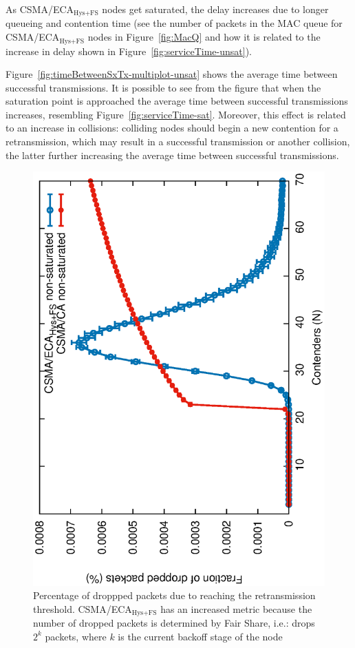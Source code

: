 	As CSMA/ECA$_{\text{Hys+FS}}$ nodes get saturated, the delay increases due to longer queueing and contention time (see the number of packets in the MAC queue for CSMA/ECA$_{\text{Hys+FS}}$ nodes in Figure~\ref{fig:MacQ} and how it is related to the increase in delay shown in Figure~\ref{fig:serviceTime-unsat}).
	
	
	Figure~\ref{fig:timeBetweenSxTx-multiplot-unsat} shows the average time between successful transmissions. It is possible to see from the figure that when the saturation point is approached the average time between successful transmissions increases, resembling Figure~\ref{fig:serviceTime-sat}. Moreover, this effect is related to an increase in collisions: colliding nodes should begin a new contention for a retransmission, which may result in a successful transmission or another collision, the latter further increasing the average time between successful transmissions.
	
   	\begin{figure}[tb]
		\centering
		\includegraphics[width=0.7\linewidth,angle=-90]{figures/unsaturated/droppedPackets/droppedPacketsDueRET-TON.eps}
		\caption{Percentage of droppped packets due to reaching the retransmission threshold. CSMA/ECA$_{\text{Hys+FS}}$ has an increased metric because the number of dropped packets is determined by Fair Share, i.e.: drops $2^{k}$ packets, where $k$ is the current backoff stage of the node}
		\label{fig:droppedDueToRET}
	\end{figure}
	
